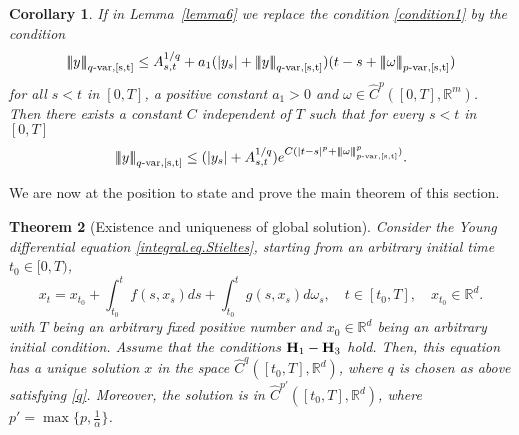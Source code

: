 \documentclass[10pt]{article}
\numberwithin{equation}{section} %
\newcommand{\R}{\ensuremath{\mathbb{R}}}
\newcommand{\ltn}{\ensuremath{\left| \! \left| \! \left|}}
\newcommand{\rtn}{\ensuremath{\right| \! \right| \! \right|}}
\newtheorem{theorem}{Theorem}[section]
{ \theorembodyfont{\normalfont} %
\newtheorem{example}[theorem]{Example}
\newtheorem{remark}[theorem]{Remark}
}
\newtheorem{corollary}[theorem]{Corollary}
\begin{document}
\begin{corollary}\label{coll6}
If in Lemma~\ref{lemma6} we replace the condition \eqref{condition1} by the condition
\begin{equation}\label{condition2}
\ltn y\rtn_{q\text{-}\rm{var},[s,t]}\leq  A^{1/q}_{s,t}+ a_1(|y_s| +\ltn y\rtn_{q\text{-}\rm{var},[s,t]}) (t-s+\ltn \omega\rtn_{p\text{-}\rm{var},[s,t]})
\end{equation}
for all $s<t$ in $[0,T]$, a positive constant $a_1>0$  and $\omega \in \widehat{C}^p([0,T],\R^m)$. Then there exists a constant  $C$ independent of $T$ such that for every $s<t$ in $[0,T]$
\begin{eqnarray}
\ltn y\rtn_{q\text{-}\rm{var},[s,t]} \leq (|y_s| + A^{1/q}_{s,t})e^{C(|t-s|^p+\ltn \omega\rtn_{p\text{-}\rm{var},[s,t]}^{p})}.
\end{eqnarray}
\end{corollary}
We are now at the position to state and prove the main theorem of this section.
\begin{theorem}[Existence and uniqueness of global solution]\label{theo2}
Consider the Young differential equation \eqref{integral.eq.Stieltes}, starting from an arbitrary initial time $t_0\in [0,T)$,
$$
	x_t=x_{t_0} +\int_{t_0}^t f(s,x_s) ds + \int_{t_0}^tg(s,x_s)d\omega_s,\quad t\in [t_0,T],\quad x_{t_0}\in\R^d.
	$$
	 with $T$ being an arbitrary fixed positive number and $x_0\in \R^d$ being an arbitrary initial condition. Assume that the conditions ${\textbf H}_1-{\textbf H}_3$ hold. Then, this equation has a unique solution $x$  in the space $\widehat{C}^{q}([t_0,T],\R^d)$, where $q$ is chosen as above satisfying \eqref{q}. Moreover, the solution is in $\widehat{C}^{p'}([t_0,T],\R^d)$, where $p'=\max\{p,\frac{1}{\alpha}\}$.  %
\end{theorem}
\end{document}
